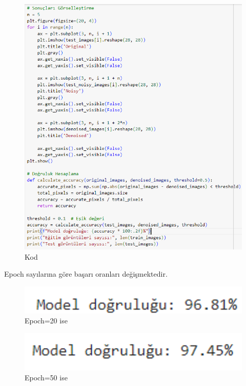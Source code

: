 \documentclass{article}
\begin{document}
\renewcommand{\figurename}{Şekil}

\begin{figure}[htbp]
     \centering
\includegraphics[angle=360,width=1.1\textwidth]{Mnıst3.png}\centering 
  \caption{Kod}
  \label{fig:resim_etiketi}
\end{figure}


\clearpage
\noindent Epoch sayılarına göre başarı oranları değişmektedir.

\renewcommand{\figurename}{Şekil}

\begin{figure}[htbp]
     \centering
\includegraphics[angle=360,width=1\textwidth]{20epoch.png}\centering 
  \caption{Epoch=20 ise}
  \label{fig:resim_etiketi}
\end{figure}

\renewcommand{\figurename}{Şekil}

\begin{figure}[htbp]
     \centering
\includegraphics[angle=360,width=1\textwidth]{50epoch.png}\centering 
  \caption{Epoch=50 ise}
  \label{fig:resim_etiketi}
\end{figure}
\end{document}
